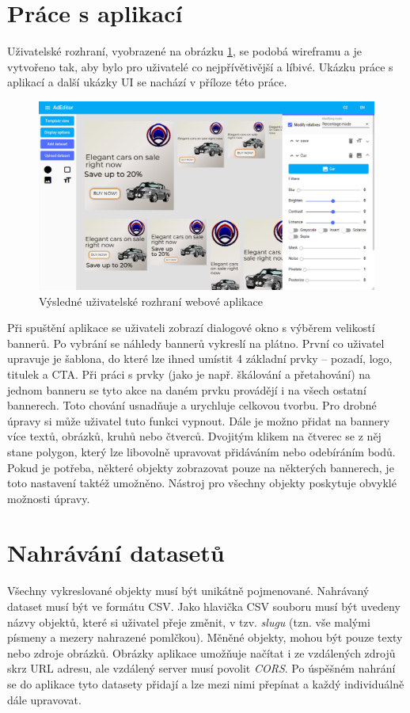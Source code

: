 \section{Práce s aplikací}
    Uživatelské rozhraní, vyobrazené na obrázku \ref{fig:ad-editor-ui}, se podobá wireframu a je vytvořeno tak, aby bylo pro uživatelé co nejpřívětivější a líbivé.
    Ukázku práce s aplikací a další ukázky UI se nachází v příloze této práce.
    \begin{figure}[h]
        \centering
        \includegraphics[width=1\textwidth]{Figures/ad-editor.png}
        \caption[UI webové aplikace]{Výsledné uživatelské rozhraní webové aplikace}
        \label{fig:ad-editor-ui}
    \end{figure}
    Při spuštění aplikace se uživateli zobrazí dialogové okno s výběrem velikostí bannerů. Po vybrání se náhledy bannerů vykreslí na plátno.
    První co uživatel upravuje je šablona, do které lze ihned umístit 4 základní prvky -- pozadí, logo, titulek a CTA.
    Při práci s prvky (jako je např. škálování a přetahování) na jednom banneru
    se tyto akce na daném prvku provádějí i na všech ostatní bannerech. Toto chování usnadňuje a urychluje celkovou tvorbu.
    Pro drobné úpravy si může uživatel tuto funkci vypnout.
    Dále je možno přidat na bannery více textů, obrázků, kruhů nebo čtverců. Dvojitým klikem na čtverec se z něj stane polygon, který lze libovolně upravovat
    přidáváním nebo odebíráním bodů. Pokud je potřeba, některé objekty zobrazovat pouze na některých bannerech, je toto nastavení taktéž umožněno.
    Nástroj pro všechny objekty poskytuje obvyklé možnosti úpravy.        

\section{Nahrávání datasetů}
    Všechny vykreslované objekty musí být unikátně pojmenované.
    Nahrávaný dataset musí být ve formátu CSV. Jako hlavička CSV souboru musí být uvedeny názvy objektů, které si uživatel přeje změnit, v tzv. \emph{slugu} (tzn. vše malými písmeny a mezery
    nahrazené pomlčkou). Měněné objekty, mohou být pouze texty nebo zdroje obrázků. Obrázky aplikace umožňuje načítat i ze vzdálených zdrojů skrz 
    URL adresu, ale vzdálený server musí povolit \emph{CORS}. Po úspěšném nahrání se do aplikace tyto datasety přidají a lze mezi nimi přepínat a každý
    individuálně dále upravovat.

